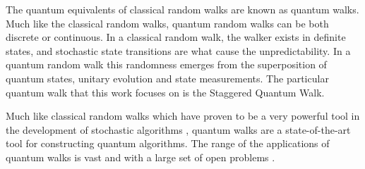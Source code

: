 The quantum equivalents of classical random walks are known as quantum walks. 
Much like the classical random walks, quantum random walks can be both discrete or continuous. 
In a classical random walk, the walker exists in definite states, and stochastic state transitions are what cause the unpredictability. In a quantum random walk this randomness emerges from the superposition of quantum states, unitary evolution and state measurements. The particular quantum walk that this work focuses on is the Staggered Quantum Walk.

Much like classical random walks which have proven to be a very powerful tool in the development of stochastic algorithms \cite{stochastic-algos,ksat}, quantum walks are a state-of-the-art tool for constructing quantum algorithms. The range of the applications of quantum walks is vast and with a large set of open problems \cite{QW-overview}. 



